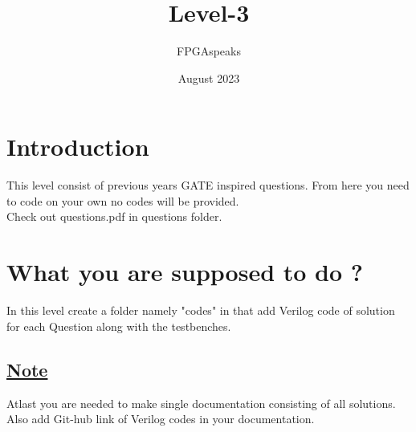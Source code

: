 \documentclass{article}
\title{\huge {\textbf{Level-3}}}
\author{FPGAspeaks}
\date{August 2023}
\begin{document}
\maketitle

\section{Introduction} This level consist of previous years GATE inspired questions. From here you need to code on your own no codes will be provided. \\
Check out questions.pdf in questions folder.
\section{What you are supposed to do ? }
In this level create a folder namely "codes" in that add Verilog code of solution for each Question along with the testbenches.
\subsection{\underline{Note}} Atlast you are needed to make single documentation consisting of all solutions. Also add Git-hub link of Verilog codes in your documentation.
\end{document}
